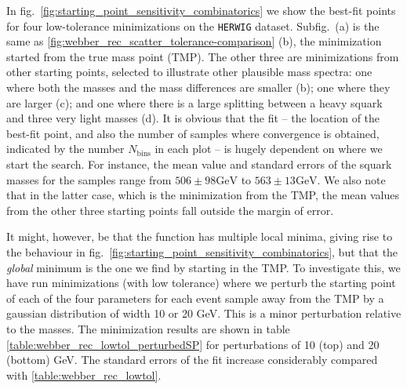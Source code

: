 \documentclass[twoside,english]{uiofysmaster}
\begin{document}
In fig.\ \ref{fig:starting_point_sensitivity_combinatorics} we show the best-fit points for four low-tolerance minimizations on the {\tt HERWIG} dataset. Subfig.\ (a) is the same as \ref{fig:webber_rec_scatter_tolerance-comparison} (b), the minimization started from the true mass point (TMP). The other three are minimizations from other starting points, selected to illustrate other plausible mass spectra: one where both the masses and the mass differences are smaller (b); one where they are larger (c); and one where there is a large splitting between a heavy squark and three very light masses (d). It is obvious that the fit -- the location of the best-fit point, and also the number of samples where convergence is obtained, indicated by the number $N_\mathrm{bins}$ in each plot -- is hugely dependent on where we start the search. For instance, the mean value and standard errors of the squark masses for the samples range from $506 \pm 98 \mathrm{GeV}$ to $563 \pm 13 \mathrm{GeV}$. We also note that in the latter case, which is the minimization from the TMP, the mean values from the other three starting points fall outside the margin of error.



It might, however, be that the function has multiple local minima, giving rise to the behaviour in fig.\ \ref{fig:starting_point_sensitivity_combinatorics}, but that the {\it global} minimum is the one we find by starting in the TMP. To investigate this, we have run minimizations (with low tolerance) where we perturb the starting point of each of the four parameters for each event sample away from the TMP by a gaussian distribution of width 10 or 20 GeV. This is a minor perturbation relative to the masses. The minimization results are shown in table \ref{table:webber_rec_lowtol_perturbedSP} for perturbations of 10 (top) and 20 (bottom) GeV. The standard errors of the fit increase considerably compared with \ref{table:webber_rec_lowtol}. 
 
\end{document}
